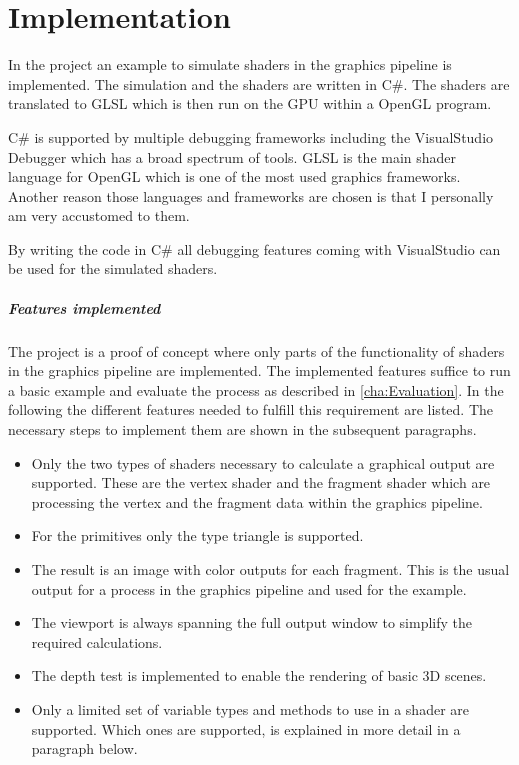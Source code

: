 
\chapter{Implementation}\label{cha:Implementation}

In the project  an example to simulate shaders in the graphics pipeline is implemented. The simulation and the shaders are written in C\#. The shaders are translated to GLSL which is then run on the GPU within a OpenGL program.

C\# is supported by multiple debugging frameworks including the VisualStudio Debugger which has a broad spectrum of tools.  GLSL is the main shader language for OpenGL which is one of the most used graphics frameworks. 
Another reason those languages and frameworks are chosen is that I personally am very accustomed to them.

By writing the code in C\# all debugging features coming with VisualStudio can be used for the simulated shaders.

\paragraph{Features implemented}

The project is a proof of concept where only parts of the functionality of shaders in the graphics pipeline are implemented. The implemented features suffice to run a basic example and evaluate the process as described in \autoref{cha:Evaluation}. In the following the different features needed to fulfill this requirement are listed. The necessary steps to implement them are shown in the subsequent paragraphs.

\begin{itemize}
\item Only the two types of shaders necessary to calculate a graphical output are supported. These are the vertex shader and the fragment shader which are processing the vertex and the fragment data within the graphics pipeline.
\item For the primitives only the type triangle is supported.
\item The result is an image with color outputs for each fragment. This is the usual output for a process in the graphics pipeline and used for the example.
\item The viewport is always spanning the full output window to simplify the required calculations.
\item The depth test is implemented to enable the rendering of basic 3D scenes.
\item Only a limited set of variable types and methods to use in a shader are supported. Which ones are supported, is explained in more detail in a paragraph below.
\end{itemize}

